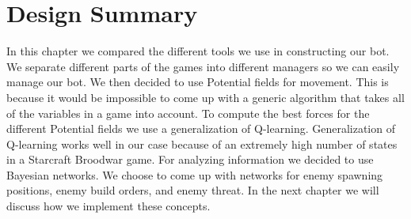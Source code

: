 \section{Design Summary}
In this chapter we compared the different tools we use in constructing our bot. We separate different parts of the games into different managers so we can easily manage our bot. We then decided to use Potential fields for movement. This is because it would be impossible to come up with a generic algorithm that takes all of the variables in a game into account. To compute the best forces for the different Potential fields we use a generalization of Q-learning. Generalization of Q-learning works well in our case because of an extremely high number of states in a Starcraft Broodwar game. For analyzing information we decided to use Bayesian networks. We choose to come up with networks for enemy spawning positions, enemy build orders, and enemy threat. In the next chapter we will discuss how we implement these concepts. 